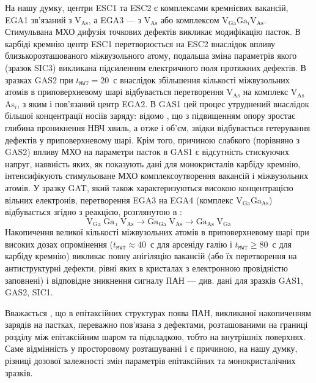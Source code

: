 На нашу думку, центри ESC1 та ESC2 є комплексами кремнієвих вакансій, EGA1 зв'язаний з V$_\text{As}$, а EGA3 --- з V$_\text{As}$ або комплексом V$_\text{Ga}$Ga$_i$V$_\text{As}$.
Стимульвана МХО дифузія точкових дефектів викликає модифікацію пасток.
В карбіді кремнію центр ESC1 перетворюється на ESC2 внаслідок впливу близькорозташованого міжвузольного атому, подальша зміна параметрів якого (зразок SIC3) викликана підсиленням електричного поля протяжних дефектів.
В зразках GAS2 при $t_\mathtt{MWT}=20$~с внаслідок збільшення кількості міжвузольних атомів в приповерхневому шарі
відбувається перетворення V$_\text{As}$ на комплекс V$_\text{As}$As$_i$, з яким і пов'язаний центр EGA2.
В GAS1 цей процес утруднений внаслідок більшої концентрації носіїв заряду:
відомо \cite{ZOHM2000}, що з підвищенням опору зростає глибина проникнення НВЧ хвиль, а отже і об'єм, звідки відбувається гетерування дефектів у приповерхневому шарі.
Крім того, причиною слабкого (порівняно з GAS2) впливу МХО на параметри пасток в GAS1 є відсутність стискуючих напруг,
наявність яких, як показують дані для монокристалів карбіду кремнію, інтенсифікують стимульоване МХО комплексоутворення вакансій і міжвузольних атомів.
У зразку GAT, який також характеризуються високою концентрацією вільних електронів,
перетворення EGA3 на EGA4 (комплекс V$_\text{Ga}$Ga$_\text{As}$) відбувається згідно з реакцією, розглянутою в \cite{FANG1990}:
\begin{equation*}
  \text{V}_\text{Ga}\;\text{Ga}_{\,i}\;\text{V}_\text{As}\rightarrow \text{Ga}_\text{Ga}\;\text{V}_\text{As}
  \rightarrow \text{Ga}_\text{As}\;\text{V}_\text{Ga}
\end{equation*}
Накопичення великої кількості міжвузольних атомів в приповерхневому шарі при високих дозах опромінення ($t_\mathtt{MWT}\approx40$~с для арсеніду галію і $t_\mathtt{MWT}\geq80$~с для карбіду кремнію) викликає повну анігіляцію вакансій (або їх перетворення на антиструктурні дефекти, рівні яких в кристалах з електронною провідністю заповнені) і відповідне зникнення сигналу ПАН --- див. дані для зразків GAS1, GAS2, SIC1.


Вважається \cite{Saiko1993,OlikhSSC,OstrovPAN}, що в епітаксійних структурах поява ПАН, викликаної накопиченням зарядів на пастках, переважно пов'язана з дефектами, розташованими на границі розділу між епітаксійним шаром та підкладкою,
тобто на внутрішніх поверхнях.
Саме відмінність у просторовому розташуванні і є причиною, на нашу думку, різниці дозової залежності змін параметрів епітаксійних та монокристалічних зразків.

